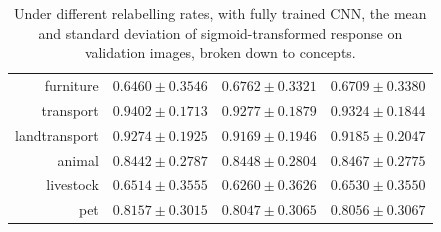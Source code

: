 \documentclass[11pt,a4paper]{article}
\begin{document}
\begin{table}[htbp]
\begin{tabular}{r|c|c|c}
furniture     & $0.6460\pm0.3546$ & $0.6762\pm0.3321$ & $0.6709\pm0.3380$\\
transport     & $0.9402\pm0.1713$ & $0.9277\pm0.1879$ & $0.9324\pm0.1844$\\
landtransport & $0.9274\pm0.1925$ & $0.9169\pm0.1946$ & $0.9185\pm0.2047$\\
animal        & $0.8442\pm0.2787$ & $0.8448\pm0.2804$ & $0.8467\pm0.2775$\\
livestock     & $0.6514\pm0.3555$ & $0.6260\pm0.3626$ & $0.6530\pm0.3550$\\
pet           & $0.8157\pm0.3015$ & $0.8047\pm0.3065$ & $0.8056\pm0.3067$
\end{tabular}
\caption{Under different relabelling rates, with fully trained CNN, the mean and standard deviation of sigmoid-transformed response on validation images, broken down to concepts.}
\label{tab:cnnresp}
\end{table}
\end{document}
